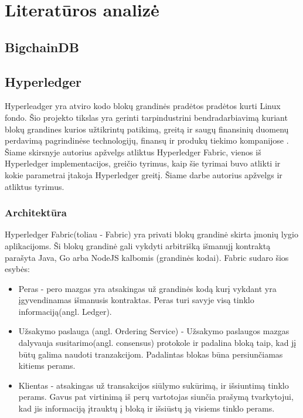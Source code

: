 \documentclass{VUMIFPSkursinis}
\begin{document}
\section{Literatūros analizė}
	\subsection{BigchainDB}
	\subsection{Hyperledger}
		Hyperleadger yra atviro kodo blokų grandinės pradėtos pradėtos kurti Linux fondo. Šio projekto tikslas yra gerinti tarpindustrini bendradarbiavimą kuriant blokų grandines kurios užtikrintų 
		patikimą, greitą ir saugų finansinių duomenų perdavimą pagrindinėse technologijų, finansų ir produkų tiekimo kompanijose \cite{LinuxHyper}. Šiame skirsnyje autorius apžvelgs 
		atliktus Hyperledger Fabric, vienos iš Hyperledger implementacijos, greičio tyrimus, kaip šie tyrimai buvo atlikti ir kokie parametrai įtakoja Hyperledger greitį. Šiame darbe autorius apžvelgs \cite{ThailandPerf} ir \cite{IMBResearch} atliktus tyrimus.
		
		\subsubsection{Architektūra}
			Hyperledger Fabric(toliau - Fabric) yra privati blokų grandinė skirta įmonių lygio aplikacijoms. 
			Ši blokų grandinė gali vykdyti arbitrišką išmanujį kontraktą parašyta Java, Go arba NodeJS kalbomis (grandinės kodai).
			Fabric sudaro šios esybės:
			\begin{itemize}
				\item{Peras - pero mazgas yra atsakingas už grandinės kodą kurį vykdant yra įgyvendinamas išmanusis kontraktas. 
 Peras turi savyje visą tinklo informaciją(angl. Ledger). }
				\item{Užsakymo paslauga (angl. Ordering Service) - Užsakymo paslaugos mazgas dalyvauja susitarimo(angl. consensus) 
protokole ir padalina bloką taip, kad jį būtų galima naudoti tranzakcijom. Padalintas blokas būna persiunčiamas kitiems perams.}
				\item{Klientas - atsakingas už transakcijos siūlymo sukūrimą, ir išsiuntimą tinklo perams. Gavus pat virtinimą iš perų vartotojas siunčia prašymą tvarkytojui, kad jis informaciją įtrauktų į bloką ir išsiūstų ją visiems tinklo perams.}
			\end{itemize}
\end{document}

